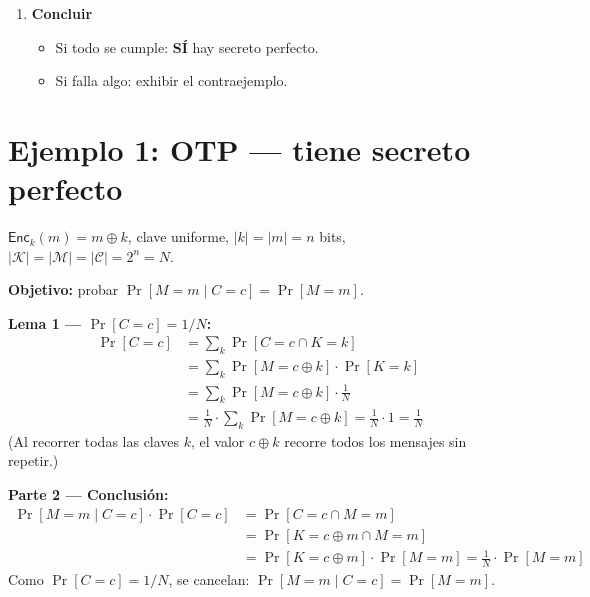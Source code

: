 \documentclass[11pt,a4paper]{article}
\begin{document}
\begin{tcolorbox}[methodstyle, title={Método paso a paso}]
\begin{enumerate}[label=\textbf{Paso \arabic{*} ---}, leftmargin=3.5em, itemsep=4pt]
  \item \textbf{Concluir}
    \begin{itemize}[leftmargin=1.5em, itemsep=1pt]
      \item Si todo se cumple: \textbf{SÍ} hay secreto perfecto.
      \item Si falla algo: exhibir el contraejemplo.
    \end{itemize}
\end{enumerate}
\end{tcolorbox}

\section{Ejemplo 1: OTP --- tiene secreto perfecto}

\begin{tcolorbox}[examplestyle, title={Ejemplo 1: One-Time Pad (OTP)}]
$\mathsf{Enc}_k(m) = m \oplus k$, clave uniforme, $|k| = |m| = n$ bits,
$|\mathcal{K}| = |\mathcal{M}| = |\mathcal{C}| = 2^n = N$.

\medskip
\textbf{Objetivo:} probar $\Pr[M{=}m \mid C{=}c] = \Pr[M{=}m]$.

\medskip
\textbf{Lema 1 --- $\Pr[C{=}c] = 1/N$:}
\begin{align*}
  \Pr[C{=}c]
    &= \sum_k \Pr[C{=}c \cap K{=}k]\\
    &= \sum_k \Pr[M = c \oplus k] \cdot \Pr[K{=}k]\\
    &= \sum_k \Pr[M = c \oplus k] \cdot \tfrac{1}{N}\\
    &= \tfrac{1}{N} \cdot \sum_k \Pr[M = c \oplus k]
     = \tfrac{1}{N} \cdot 1
     = \frac{1}{N}
\end{align*}
(Al recorrer todas las claves $k$, el valor $c \oplus k$ recorre todos los mensajes sin repetir.)

\medskip
\textbf{Parte 2 --- Conclusión:}
\begin{align*}
  \Pr[M{=}m \mid C{=}c] \cdot \Pr[C{=}c]
    &= \Pr[C{=}c \cap M{=}m]\\
    &= \Pr[K{=}c \oplus m \cap M{=}m]\\
    &= \Pr[K{=}c \oplus m] \cdot \Pr[M{=}m]
     = \tfrac{1}{N} \cdot \Pr[M{=}m]
\end{align*}
Como $\Pr[C{=}c] = 1/N$, se cancelan:
$\Pr[M{=}m \mid C{=}c] = \Pr[M{=}m]$.
\end{tcolorbox}
\end{document}
